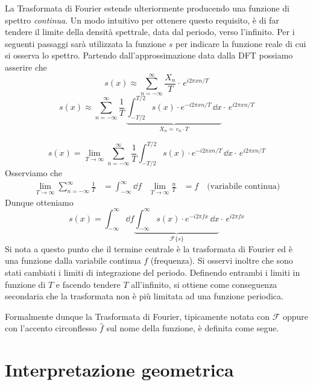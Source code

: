 La Trasformata di Fourier estende ulteriormente producendo una funzione di
spettro \emph{continua}.  Un modo intuitivo per ottenere questo requisito, \`e
di far tendere il limite della densit\`a spettrale, data dal periodo, verso
l'infinito.  Per i seguenti passaggi sar\`a utilizzata la funzione \(s\) per
indicare la funzione reale di cui si osserva lo spettro. Partendo
dall'approssimazione data dalla DFT possiamo asserire che
\[
    s(x) \approx \sum_{n=-\infty}^\infty \frac{X_n}{T}
        \cdot\,e^{i2\pi xn/T}
\]
\[
    s(x) \approx \sum_{n=-\infty}^\infty
        \frac{1}{T}\,
        \underbrace{
            \int_{-T/2}^{T/2} s(x)\cdot e^{-i2\pi xn/T}\,\dd{x}
        }_{X_n =\,c_n\cdot T}
        \cdot\,e^{i2\pi xn/T}
\]


\[
    s(x) = \lim_{T\to\infty} \sum_{n=-\infty}^\infty
        \frac{1}{T}\int_{-T/2}^{T/2} s(x)\cdot e^{-i2\pi xn/T}\,\dd{x}
        \cdot\,e^{i2\pi xn/T}
\]
Osserviamo che
\begin{align*}
    \lim_{T\to\infty} \sum_{n=-\infty}^\infty \frac{1}{T} &= \int_{-\infty}^\infty \dd{f} &
    \lim_{T\to\infty} \frac{n}{T} &= f \quad \text{(variabile continua)}
\end{align*}
Dunque otteniamo
\[
    s(x) = \int_{-\infty}^\infty \dd{f} 
           \underbrace{
               \int_{-\infty}^\infty s(x)\cdot e^{-i2\pi fx}\,\dd{x}
           }_{\mathcal{F}\{s\}}
           \cdot\,e^{i2\pi fx}
\]
Si nota a questo punto che il termine centrale \`e la trasformata di Fourier
ed \`e una funzione dalla variabile continua \(f\) (frequenza).
Si osservi inoltre che sono stati cambiati i limiti di integrazione del
periodo.  Definendo entrambi i limiti in funzione di \(T\) e facendo tendere
\(T\) all'infinito, si ottiene come conseguenza secondaria che la trasformata
non \`e pi\`u limitata ad una funzione periodica.

Formalmente dunque la Trasformata di Fourier, tipicamente notata con
\(\mathcal{F}\) oppure con l'accento circonflesso \(\hat{f}\) sul nome della
funzione, \`e definita come segue.

\noindent\fbox{\begin{minipage}{\textwidth}\[
    \mathcal{F}\{f\} = \hat{f}\,(\omega) 
    = \int_{-\infty}^\infty f(x)\cdot e^{-i\omega x}\,\dd{x}
\]\end{minipage}}

\section{Interpretazione geometrica}
